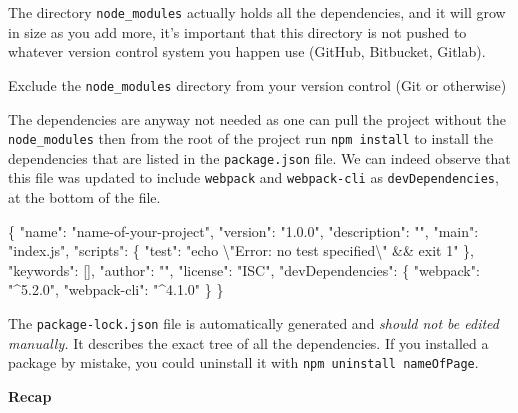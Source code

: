 \documentclass[10pt,]{krantz}
\makeatletter
\newenvironment{Shaded}{\begin{snugshade}}{\end{snugshade}}
\newcommand{\CharTok}[1]{\textcolor[rgb]{0.5,0.5,0.5}{#1}}
\newcommand{\DataTypeTok}[1]{\textcolor[rgb]{0.27,0.27,0.27}{#1}}
\newcommand{\FunctionTok}[1]{\textcolor[rgb]{0,0,0}{#1}}
\newcommand{\OtherTok}[1]{\textcolor[rgb]{0.37,0.37,0.37}{#1}}
\newcommand{\StringTok}[1]{\textcolor[rgb]{0.5,0.5,0.5}{#1}}
\newenvironment{kframe}{%
\medskip{}
\setlength{\fboxsep}{.8em}
 \def\at@end@of@kframe{}%
 \ifinner\ifhmode%
  \def\at@end@of@kframe{\end{minipage}}%
  \begin{minipage}{\columnwidth}%
 \fi\fi%
 \def\FrameCommand##1{\hskip\@totalleftmargin \hskip-\fboxsep
 \colorbox{shadecolor}{##1}\hskip-\fboxsep
     \hskip-\linewidth \hskip-\@totalleftmargin \hskip\columnwidth}%
 \MakeFramed {\advance\hsize-\width
   \@totalleftmargin\z@ \linewidth\hsize
   \@setminipage}}%
 {\par\unskip\endMakeFramed%
 \at@end@of@kframe}
\renewenvironment{Shaded}{\begin{kframe}}{\end{kframe}}
\newenvironment{rmdblock}[1]
  {
  \begin{itemize}
  \renewcommand{\labelitemi}{
    \raisebox{-.7\height}[0pt][0pt]{
      {\setkeys{Gin}{width=3em,keepaspectratio}\texttt{[image: images/\#1]}}
    }
  }
  \setlength{\fboxsep}{1em}
  \begin{kframe}
  \item
  }
  {
  \end{kframe}
  \end{itemize}
  }
\newenvironment{rmdnote}
  {\begin{rmdblock}{note}}
  {\end{rmdblock}}
\makeatother
\begin{document}
The directory \texttt{node\_modules} actually holds all the dependencies, and it will grow in size as you add more, it's important that this directory is not pushed to whatever version control system you happen use (GitHub, Bitbucket, Gitlab).

\begin{rmdnote}
Exclude the \texttt{node\_modules} directory from your version control
(Git or otherwise)
\end{rmdnote}

The dependencies are anyway not needed as one can pull the project without the \texttt{node\_modules} then from the root of the project run \texttt{npm\ install} to install the dependencies that are listed in the \texttt{package.json} file. We can indeed observe that this file was updated to include \texttt{webpack} and \texttt{webpack-cli} as \texttt{devDependencies}, at the bottom of the file.

\begin{Shaded}
\begin{Highlighting}[]
\FunctionTok{\{}
  \DataTypeTok{"name"}\FunctionTok{:} \StringTok{"name-of-your-project"}\FunctionTok{,}
  \DataTypeTok{"version"}\FunctionTok{:} \StringTok{"1.0.0"}\FunctionTok{,}
  \DataTypeTok{"description"}\FunctionTok{:} \StringTok{""}\FunctionTok{,}
  \DataTypeTok{"main"}\FunctionTok{:} \StringTok{"index.js"}\FunctionTok{,}
  \DataTypeTok{"scripts"}\FunctionTok{:} \FunctionTok{\{}
    \DataTypeTok{"test"}\FunctionTok{:} \StringTok{"echo }\CharTok{\textbackslash{}"}\StringTok{Error: no test specified}\CharTok{\textbackslash{}"}\StringTok{ && exit 1"}
  \FunctionTok{\},}
  \DataTypeTok{"keywords"}\FunctionTok{:} \OtherTok{[]}\FunctionTok{,}
  \DataTypeTok{"author"}\FunctionTok{:} \StringTok{""}\FunctionTok{,}
  \DataTypeTok{"license"}\FunctionTok{:} \StringTok{"ISC"}\FunctionTok{,}
  \DataTypeTok{"devDependencies"}\FunctionTok{:} \FunctionTok{\{}
    \DataTypeTok{"webpack"}\FunctionTok{:} \StringTok{"^5.2.0"}\FunctionTok{,}
    \DataTypeTok{"webpack-cli"}\FunctionTok{:} \StringTok{"^4.1.0"}
  \FunctionTok{\}}
\FunctionTok{\}}
\end{Highlighting}
\end{Shaded}

The \texttt{package-lock.json} file is automatically generated and \emph{should not be edited manually.} It describes the exact tree of all the dependencies. If you installed a package by mistake, you could uninstall it with \texttt{npm\ uninstall\ nameOfPage}.

\textbf{Recap}
\end{document}
